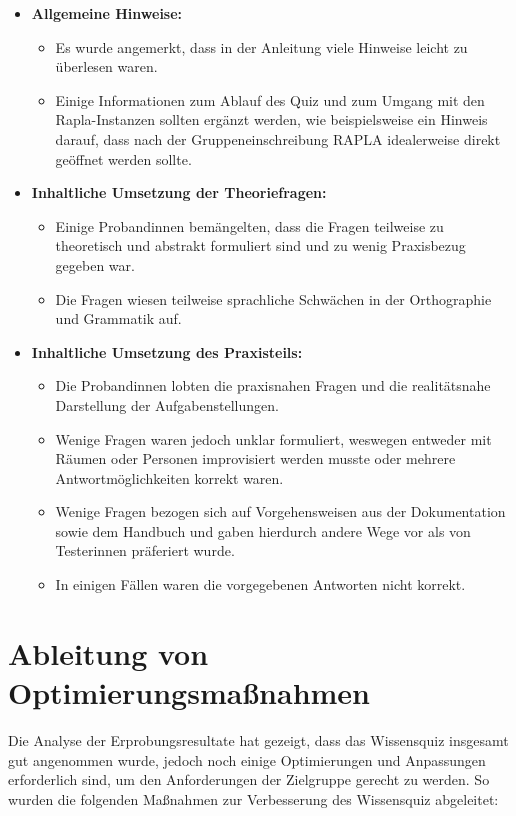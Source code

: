 \begin{itemize}
    \item \textbf{Allgemeine Hinweise:}
    \begin{itemize}
        \item Es wurde angemerkt, dass in der Anleitung viele Hinweise leicht zu überlesen waren. 
        \item Einige Informationen zum Ablauf des Quiz und zum Umgang mit den Rapla-Instanzen sollten ergänzt werden, wie beispielsweise ein Hinweis darauf, dass nach der Gruppeneinschreibung RAPLA idealerweise direkt geöffnet werden sollte.
    \end{itemize}
        \item \textbf{Inhaltliche Umsetzung der Theoriefragen:}
    \begin{itemize}
        \item Einige Probandinnen bemängelten, dass die Fragen teilweise zu theoretisch und abstrakt formuliert sind und zu wenig Praxisbezug gegeben war.
        \item Die Fragen wiesen teilweise sprachliche Schwächen in der Orthographie und Grammatik auf.
    \end{itemize}
    \item \textbf{Inhaltliche Umsetzung des Praxisteils:}
    \begin{itemize}
        \item Die Probandinnen lobten die praxisnahen Fragen und die realitätsnahe Darstellung der Aufgabenstellungen.
        \item Wenige Fragen waren jedoch unklar formuliert, weswegen entweder mit Räumen oder Personen improvisiert werden musste oder mehrere Antwortmöglichkeiten korrekt waren.
        \item Wenige Fragen bezogen sich auf Vorgehensweisen aus der Dokumentation sowie dem Handbuch und gaben hierdurch andere Wege vor als von Testerinnen präferiert wurde.
        \item In einigen Fällen waren die vorgegebenen Antworten nicht korrekt.
    \end{itemize}
\end{itemize}
\section{Ableitung von Optimierungsmaßnahmen}
Die Analyse der Erprobungsresultate hat gezeigt, dass das Wissensquiz insgesamt gut angenommen wurde, 
jedoch noch einige Optimierungen und Anpassungen erforderlich sind, um den Anforderungen der Zielgruppe
gerecht zu werden. So wurden die folgenden Maßnahmen zur Verbesserung des Wissensquiz abgeleitet:

